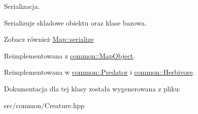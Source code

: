 Serializacja. 

Serializuje skladowe obiektu oraz klase bazowa.

\begin{DoxySeeAlso}{Zobacz również}
\hyperlink{classcommon_1_1Map_adea5eca91ec93db01ec5920bb26a3fd3}{Map\-::serialize} 
\end{DoxySeeAlso}


Reimplementowana z \hyperlink{classcommon_1_1MapObject_ac9f0fecb3c62b2fae69bbad56eb18944}{common\-::\-Map\-Object}.



Reimplementowana w \hyperlink{classcommon_1_1Predator_a2b9515fa6275dd582259cb144dc1d8cf}{common\-::\-Predator} i \hyperlink{classcommon_1_1Herbivore_affb4a1d96e6f92d41223d2f5eb2d6f03}{common\-::\-Herbivore}.



Dokumentacja dla tej klasy została wygenerowana z pliku\-:\begin{DoxyCompactItemize}
\item 
src/common/Creature.\-hpp\end{DoxyCompactItemize}
